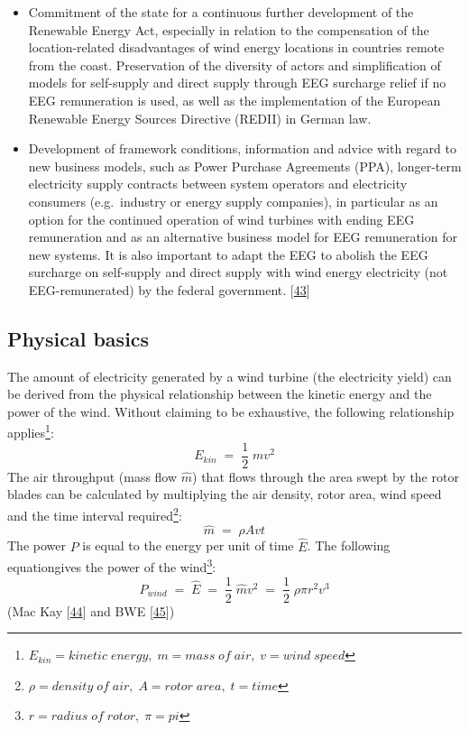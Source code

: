 \documentclass[a4paper,11pt]{article}
\begin{document}
\begin{itemize}
\item
  Commitment of the state for a continuous further development of the Renewable Energy Act, especially in relation to the compensation of the location-related disadvantages of wind energy locations in countries remote from the coast. Preservation of the diversity of actors and simplification of models for self-supply and direct supply through EEG surcharge relief if no EEG remuneration is used, as well as the implementation of the European Renewable Energy Sources Directive (REDII) in German law.
\item
  Development of framework conditions, information and advice with regard to new business models, such as Power Purchase Agreements (PPA), longer-term electricity supply contracts between system operators and electricity consumers (e.g.~industry or energy supply companies), in particular as an option for the continued operation of wind turbines with ending EEG remuneration and as an alternative business model for EEG remuneration for new systems. It is also important to adapt the EEG to abolish the EEG surcharge on self-supply and direct supply with wind energy electricity (not EEG-remunerated) by the federal government.
  {[}\protect\hyperlink{ref-MinisteriumfurUmweltEnergieErnahrungundForsten.2020}{43}{]}
\end{itemize}
\hypertarget{physical-basics}{%
\subsection{Physical basics}\label{physical-basics}}

The amount of electricity generated by a wind turbine (the electricity yield) can be derived from the physical relationship between the kinetic energy and the power of the wind. Without claiming to be exhaustive, the following relationship applies\footnote{\(E_{kin}= kinetic\; energy,\; m=mass\; of\; air,\; v= wind\;speed\)}:
\begin{equation}
E_{kin}\; =\; \frac{1}{2}\;mv^2
\end{equation}
The air throughput (mass flow \(\hat{m}\)) that flows through the area swept by the rotor blades can be calculated by multiplying the air density, rotor area, wind speed and the time interval required\footnote{\(\rho= density\; of\; air,\; A= rotor\; area,\; t=time\)}:
\begin{equation}
\hat{m}\;=\;\rho A vt
\end{equation}
The power \(P\) is equal to the energy per unit of time \(\hat{E}\). The following equationgives the power of the wind\footnote{\(r= radius\; of\; rotor, \; \pi=pi\)}:
\begin{equation}
P_{wind}\;=\;\hat{E}\;=\;\frac{1}{2}\;\hat{m}v^2\;=\;\frac{1}{2}\; \rho \pi r^2 v^3
\end{equation}
(Mac Kay {[}\protect\hyperlink{ref-DavidJCMacKay.2009}{44}{]} and BWE {[}\protect\hyperlink{ref-BWE.2021}{45}{]})
\end{document}
